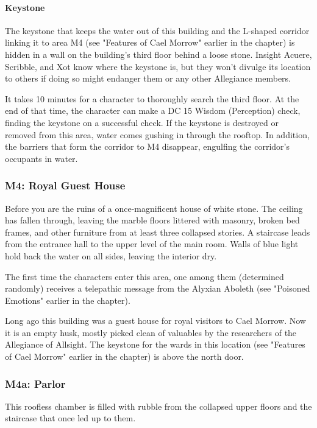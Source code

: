 \documentclass[10pt,a4paper,twoside,twocolumn,openany,nodeprecatedcode]{dndbook}
\begin{document}
\paragraph{Keystone}
The keystone that keeps the water out of this building and the L-shaped corridor linking it to area M4 (see "Features of Cael Morrow" earlier in the chapter) is hidden in a wall on the building's third floor behind a loose stone. Insight Acuere, Scribble, and Xot know where the keystone is, but they won't divulge its location to others if doing so might endanger them or any other Allegiance members.

It takes 10 minutes for a character to thoroughly search the third floor. At the end of that time, the character can make a DC 15 Wisdom (Perception) check, finding the keystone on a successful check. If the keystone is destroyed or removed from this area, water comes gushing in through the rooftop. In addition, the barriers that form the corridor to M4 disappear, engulfing the corridor's occupants in water.

\subsubsection{M4: Royal Guest House}
\begin{DndReadAloud}{}
Before you are the ruins of a once-magnificent house of white stone. The ceiling has fallen through, leaving the marble floors littered with masonry, broken bed frames, and other furniture from at least three collapsed stories. A staircase leads from the entrance hall to the upper level of the main room. Walls of blue light hold back the water on all sides, leaving the interior dry.

\end{DndReadAloud}

The first time the characters enter this area, one among them (determined randomly) receives a telepathic message from the Alyxian Aboleth (see "Poisoned Emotions" earlier in the chapter).

Long ago this building was a guest house for royal visitors to Cael Morrow. Now it is an empty husk, mostly picked clean of valuables by the researchers of the Allegiance of Allsight. The keystone for the wards in this location (see "Features of Cael Morrow" earlier in the chapter) is above the north door.

\subsubsection{M4a: Parlor}
This roofless chamber is filled with rubble from the collapsed upper floors and the staircase that once led up to them.
\end{document}
